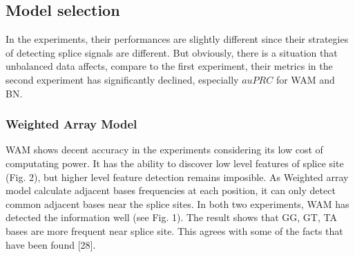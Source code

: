 \documentclass[11pt]{article}
\begin{document}
    \hypertarget{model-selection}{%
\subsection{Model selection}\label{model-selection}}

In the experiments, their performances are slightly different since
their strategies of detecting splice signals are different. But
obviously, there is a situation that unbalanced data affects, compare to
the first experiment, their metrics in the second experiment has
significantly declined, especially \(auPRC\) for WAM and BN.

    \hypertarget{weighted-array-model}{%
\subsubsection{Weighted Array Model}\label{weighted-array-model}}

WAM shows decent accuracy in the experiments considering its low cost of
computating power. It has the ability to discover low level features of
splice site (Fig. 2), but higher level feature detection remains
imposible. As Weighted array model calculate adjacent bases frequencies
at each position, it can only detect common adjacent bases near the
splice sites. In both two experiments, WAM has detected the information
well (see Fig. 1). The result shows that GG, GT, TA bases are more
frequent near splice site. This agrees with some of the facts that have
been found {[}28{]}.
\end{document}
